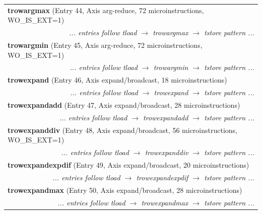 \begin{longtable}{r r r r r r r r}
\multicolumn{8}{l}{\textbf{trowargmax} (Entry 44, Axis arg-reduce, 72 microinstructions, WO\_IS\_EXT=1)} \\
  & \multicolumn{7}{r}{\textit{... entries follow tload $\rightarrow$ trowargmax $\rightarrow$ tstore pattern ...}} \\

\multicolumn{8}{l}{\textbf{trowargmin} (Entry 45, Axis arg-reduce, 72 microinstructions, WO\_IS\_EXT=1)} \\
  & \multicolumn{7}{r}{\textit{... entries follow tload $\rightarrow$ trowargmin $\rightarrow$ tstore pattern ...}} \\

\multicolumn{8}{l}{\textbf{trowexpand} (Entry 46, Axis expand/broadcast, 18 microinstructions)} \\
  & \multicolumn{7}{r}{\textit{... entries follow tload $\rightarrow$ trowexpand $\rightarrow$ tstore pattern ...}} \\

\multicolumn{8}{l}{\textbf{trowexpandadd} (Entry 47, Axis expand/broadcast, 28 microinstructions)} \\
  & \multicolumn{7}{r}{\textit{... entries follow tload $\rightarrow$ trowexpandadd $\rightarrow$ tstore pattern ...}} \\

\multicolumn{8}{l}{\textbf{trowexpanddiv} (Entry 48, Axis expand/broadcast, 56 microinstructions, WO\_IS\_EXT=1)} \\
  & \multicolumn{7}{r}{\textit{... entries follow tload $\rightarrow$ trowexpanddiv $\rightarrow$ tstore pattern ...}} \\

\multicolumn{8}{l}{\textbf{trowexpandexpdif} (Entry 49, Axis expand/broadcast, 20 microinstructions)} \\
  & \multicolumn{7}{r}{\textit{... entries follow tload $\rightarrow$ trowexpandexpdif $\rightarrow$ tstore pattern ...}} \\

\multicolumn{8}{l}{\textbf{trowexpandmax} (Entry 50, Axis expand/broadcast, 28 microinstructions)} \\
  & \multicolumn{7}{r}{\textit{... entries follow tload $\rightarrow$ trowexpandmax $\rightarrow$ tstore pattern ...}} \\


\end{longtable}
